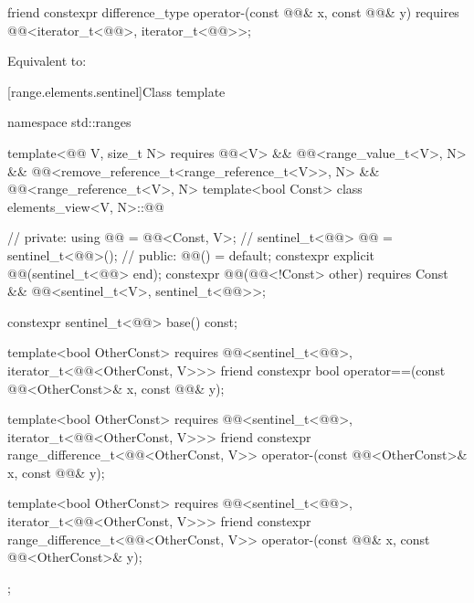 %
\begin{itemdecl}
friend constexpr difference_type operator-(const @@& x, const @@& y)
  requires @@<iterator_t<@@>, iterator_t<@@>>;
\end{itemdecl}

\begin{itemdescr}
\pnum
\effects
Equivalent to: 
\end{itemdescr}

[range.elements.sentinel]{Class template }

%
\begin{codeblock}
namespace std::ranges {
  template<@@ V, size_t N>
    requires @@<V> && @@<range_value_t<V>, N> &&
             @@<remove_reference_t<range_reference_t<V>>, N> &&
             @@<range_reference_t<V>, N>
  template<bool Const>
  class elements_view<V, N>::@@ {                 // \expos
  private:
    using @@ = @@<Const, V>;                 // \expos
    sentinel_t<@@> @@ = sentinel_t<@@>();         // \expos
  public:
    @@() = default;
    constexpr explicit @@(sentinel_t<@@> end);
    constexpr @@(@@<!Const> other)
      requires Const && @@<sentinel_t<V>, sentinel_t<@@>>;

    constexpr sentinel_t<@@> base() const;

    template<bool OtherConst>
      requires @@<sentinel_t<@@>, iterator_t<@@<OtherConst, V>>>
    friend constexpr bool operator==(const @@<OtherConst>& x, const @@& y);

    template<bool OtherConst>
      requires @@<sentinel_t<@@>, iterator_t<@@<OtherConst, V>>>
    friend constexpr range_difference_t<@@<OtherConst, V>>
      operator-(const @@<OtherConst>& x, const @@& y);

    template<bool OtherConst>
      requires @@<sentinel_t<@@>, iterator_t<@@<OtherConst, V>>>
    friend constexpr range_difference_t<@@<OtherConst, V>>
      operator-(const @@& x, const @@<OtherConst>& y);
  };
}
\end{codeblock}

